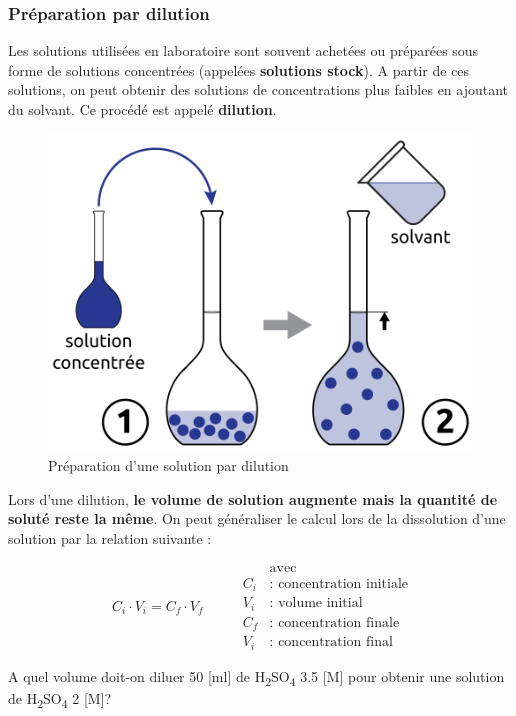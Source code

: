 \documentclass[
  11pt,
  a4paper,
  openany]{book}
\begin{document}
\hypertarget{pruxe9paration-par-dilution}{%
\subsubsection{Préparation par dilution}\label{pruxe9paration-par-dilution}}

Les solutions utilisées en laboratoire sont souvent achetées ou préparées sous forme de solutions concentrées (appelées \textbf{solutions stock}). A partir de ces solutions, on peut obtenir des solutions de concentrations plus faibles en ajoutant du solvant. Ce procédé est appelé \textbf{dilution}.

\begin{figure}

{\centering \includegraphics[width=0.33\linewidth]{images/preparation-2} 

}

\caption{Préparation d'une solution par dilution}\label{fig:preparation-2}
\end{figure}

Lors d'une dilution, \textbf{le volume de solution augmente mais la quantité de soluté reste la même}. On peut généraliser le calcul lors de la dissolution d'une solution par la relation suivante :

\[
\begin{split}
C_i \cdot V_i = C_f \cdot V_f
\end{split}
\qquad
\begin{split}
  & \text{avec} \\
  C_i & \text{: concentration initiale} \\
  V_i & \text{: volume initial} \\
  C_f & \text{: concentration finale} \\
  V_i & \text{: concentration final}
\end{split}
\]

\newpage

\begin{Exercise}
A quel volume doit-on diluer 50 {[}ml{]} de H\textsubscript{2}SO\textsubscript{4} 3.5 {[}M{]} pour obtenir une solution de H\textsubscript{2}SO\textsubscript{4} 2 {[}M{]}?

\end{Exercise}
\end{document}
